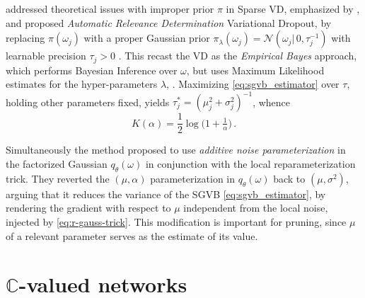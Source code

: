 \documentclass[a4paper,10pt,twocolumn]{article}
\newcommand{\cplx}{\mathbb{C}}
\begin{document}
\citet{kharitonov_variational_2018} addressed theoretical issues with improper prior
$\pi$ in Sparse VD, emphasized by \citet{hron_variational_2018}, and proposed
\emph{Automatic Relevance Determination} Variational Dropout, by replacing $\pi(\omega_j)$
with a proper Gaussian prior $
  \pi_\lambda(\omega_j) = \mathcal{N}(\omega_j \vert\, 0, \tau_j^{-1})
$ with learnable precision $\tau_j > 0$ \citep{neal_bayesian_1996}. This recast the VD
as the \emph{Empirical Bayes} approach, which performs Bayesian Inference over $\omega$,
but uses Maximum Likelihood estimates for the hyper-parameters $\lambda$,
\citep{mackay_bayesian_1994}. Maximizing \eqref{eq:sgvb_estimator} over $\tau$, holding
other parameters fixed, yields $
  \tau^*_j = {(\mu_j^2 + \sigma^2_j)}^{-1}
$, whence
\begin{equation}  \label{eq:ard-kl-div-real}
  K(\alpha)
    = \frac12 \log{\bigl(1 + \tfrac1{\alpha} \bigr)}
    \,.
\end{equation}


Simultaneously the method \citet{molchanov_variational_2017} proposed to use \emph{additive
noise parameterization} in the factorized Gaussian $q_\theta(\omega)$ in conjunction with
the local reparameterization trick. They reverted the $(\mu, \alpha)$ parameterization in
$q_\theta(\omega)$ back to $(\mu, \sigma^2)$, arguing that it reduces the variance of the
SGVB \eqref{eq:sgvb_estimator}, by rendering the gradient with respect to $\mu$ independent
from the local noise, injected by \eqref{eq:r-gauss-trick}. This modification is important
for pruning, since $\mu$ of a relevant parameter serves as the estimate of its value.




\section{$\cplx$-valued networks} %
\label{sec:c_valued_networks}
\end{document}

